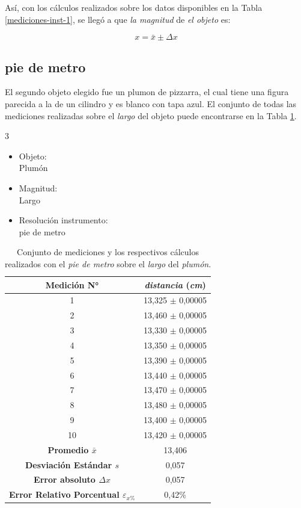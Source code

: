 \documentclass[12pt,a4paper]{article}
\begin{document}
Así, con los cálculos realizados sobre los datos disponibles en la Tabla \ref{mediciones-inst-1}, se llegó a que \textit{la magnitud} de \textit{el objeto} es:

\begin{equation*}
x = \bar{x} \pm \Delta x
\end{equation*}

\subsection{pie de metro}

El segundo objeto elegido fue un plumon de pizzarra, el cual tiene una figura parecida a la de un cilindro y es blanco con tapa azul. El conjunto de todas las mediciones realizadas sobre el \textit{largo} del objeto puede encontrarse en la Tabla \ref{mediciones-inst-2}.

\begin{multicols}{3}
\begin{itemize}
    \item Objeto: \\ Plumón
    \item Magnitud: \\ Largo
    \item Resolución instrumento: \\ pie de metro 
\end{itemize}
\end{multicols}

\begin{table}[h!]
\centering
\begin{tabular}{|c|c|}
\hline
\textbf{Medición N°} & \textit{distancia} \textbf{(}\textit{cm}\textbf{)} \\ \hline
1 & 13,325 $\pm$ 0,00005 \\ \hline
2 & 13,460 $\pm$ 0,00005 \\ \hline
3 & 13,330 $\pm$ 0,00005 \\ \hline
4 & 13,350 $\pm$ 0,00005 \\ \hline
5 & 13,390 $\pm$ 0,00005 \\ \hline
6 & 13,440 $\pm$ 0,00005 \\ \hline
7 & 13,470 $\pm$ 0,00005 \\ \hline
8 & 13,480 $\pm$ 0,00005 \\ \hline
9 & 13,400 $\pm$ 0,00005 \\ \hline
10 & 13,420 $\pm$ 0,00005 \\ \hline
\textbf{Promedio $\bar{x}$} & 13,406 \\ \hline
\textbf{Desviación Estándar $s$} & 0,057 \\ \hline
\textbf{Error absoluto $\Delta x$} & 0,057 \\ \hline
\textbf{Error Relativo Porcentual $\varepsilon_{x\%}$} & 0,42\% \\ \hline
\end{tabular}
\caption{Conjunto de mediciones y los respectivos cálculos realizados con el \textit{pie de metro} sobre el \textit{largo} del \textit{plumón}.}
\label{mediciones-inst-2}
\end{table}
\end{document}

